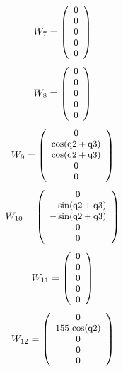 \documentclass[fleqn, a4paper, 5pt, russian]{article}
\begin{document}
\begin{landscape}
\begin{equation}
\small{
	W_{7}=
	\left(\begin{array}{c} 0\\ 0\\ 0\\ 0\\ 0 \end{array}\right)
}\end{equation}
\begin{equation}
\small{
	W_{8}=
	\left(\begin{array}{c} 0\\ 0\\ 0\\ 0\\ 0 \end{array}\right)
}\end{equation}
\begin{equation}
\small{
	W_{9}=
	\left(\begin{array}{c} 0\\ \cos\!\left(\mathrm{q2} + \mathrm{q3}\right)\\ \cos\!\left(\mathrm{q2} + \mathrm{q3}\right)\\ 0\\ 0 \end{array}\right)
}\end{equation}
\begin{equation}
\small{
	W_{10}=
	\left(\begin{array}{c} 0\\ - \sin\!\left(\mathrm{q2} + \mathrm{q3}\right)\\ - \sin\!\left(\mathrm{q2} + \mathrm{q3}\right)\\ 0\\ 0 \end{array}\right)
}\end{equation}
\begin{equation}
\small{
	W_{11}=
	\left(\begin{array}{c} 0\\ 0\\ 0\\ 0\\ 0 \end{array}\right)
}\end{equation}
\begin{equation}
\small{
	W_{12}=
	\left(\begin{array}{c} 0\\ 155\, \cos\!\left(\mathrm{q2}\right)\\ 0\\ 0\\ 0 \end{array}\right)
}
\end{equation}
\end{landscape}
\end{document}
